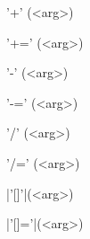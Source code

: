 \begin{urbiscriptapi}
\item['+'](<arg>)%
\begin{urbiassert}

\end{urbiassert}

\item['+='](<arg>)%
\begin{urbiassert}

\end{urbiassert}

\item['-'](<arg>)%
\begin{urbiassert}

\end{urbiassert}

\item['-='](<arg>)%
\begin{urbiassert}

\end{urbiassert}

\item['/'](<arg>)%
\begin{urbiassert}

\end{urbiassert}

\item['/='](<arg>)%
\begin{urbiassert}

\end{urbiassert}

\item|'[]'|(<arg>)%
\begin{urbiassert}

\end{urbiassert}

\item|'[]='|(<arg>)%
\begin{urbiassert}

\end{urbiassert}
\end{urbiscriptapi}

